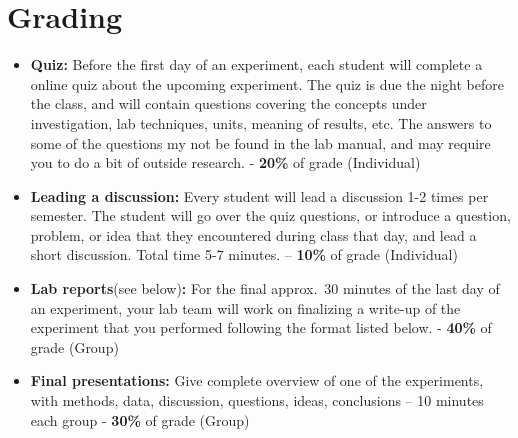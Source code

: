 \newpage

\section*{Grading}
\begin{itemize}
\itemsep0em
\item \textbf{Quiz:}  Before the first day of an experiment, each student will complete a online quiz about the upcoming experiment. The quiz is due the night before the class, and will contain questions covering the concepts under investigation, lab techniques, units, meaning of results, etc. The answers to some of the questions my not be found in the lab manual, and may require you to do a bit of outside research. \newline - \textbf{20\%} of grade (Individual)
\item \textbf{Leading a discussion:} Every student will lead a discussion 1-2 times per semester. The student will go over the quiz questions, or introduce a question, problem, or idea that they encountered during class that day, and lead a short discussion. Total time 5-7 minutes. \newline – \textbf{10\%} of grade (Individual)
\item \textbf{Lab reports}(see below)\textbf{:} For the final approx.\ 30 minutes of the last day of an experiment, your lab team will work on finalizing a write-up of the experiment that you performed following the format listed below. \newline - \textbf{40\%} of grade (Group)
\item \textbf{Final presentations:} Give complete overview of one of the experiments, with methods, data, discussion, questions, ideas, conclusions – 10 minutes each group \newline - \textbf{30\%} of grade (Group)
\end{itemize}

